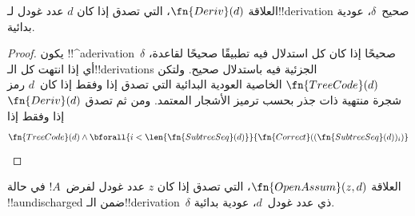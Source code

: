 \documentclass[../../../include/open-logic-section]{subfiles}
\begin{document}
\begin{prop}
  العلاقة $\fn{Deriv}(d)$، التي تصدق إذا كان $d$ عدد غودل
  لـ!!{derivation} صحيح~$\delta$، عودية بدائية.
\end{prop}

\begin{proof}
  يكون !!^a{derivation}~$\delta$ صحيحًا إذا كان كل استدلال فيه تطبيقًا
  صحيحًا لقاعدة، أي إذا انتهت كل الـ!!{derivation}s الجزئية فيه باستدلال
  صحيح. ولتكن $\fn{TreeCode}(d)$ الخاصية العودية البدائية التي تصدق
  إذا وفقط إذا كان~$d$ رمز شجرة منتهية ذات جذر بحسب ترميز الأشجار
  المعتمد. ومن ثم تصدق $\fn{Deriv}(d)$ إذا وفقط إذا
  \[
  \fn{TreeCode}(d) \land
  \bforall{i<\len{\fn{SubtreeSeq}(d)}}{\fn{Correct}((\fn{SubtreeSeq}(d))_i)}
  \]
\end{proof}

\begin{prop}
   العلاقة $\fn{OpenAssum}(z,d)$، التي تصدق
  إذا كان $z$ عدد غودل لفرض~$!A$ في حالة !!a{undischarged} ضمن
  الـ!!{derivation}~$\delta$ ذي عدد غودل~$d$، عودية بدائية.
\end{prop}
\end{document}
